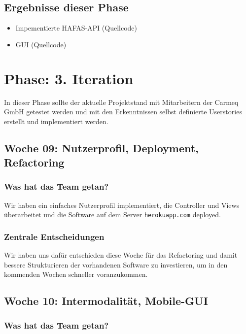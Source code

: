 \documentclass[12pt,a4paper]{article}
\begin{document}
\subsection{Ergebnisse dieser Phase}

\begin{itemize}
\item Impementierte HAFAS-API (Quellcode)
\item GUI (Quellcode)
\end{itemize}


\section{Phase: 3. Iteration}

In dieser Phase sollte der aktuelle Projektstand mit Mitarbeitern der Carmeq GmbH getestet werden und mit den Erkenntnissen selbst definierte Userstories erstellt und implementiert werden.

\subsection{Woche 09: Nutzerprofil, Deployment, Refactoring}

\subsubsection{Was hat das Team getan?}

Wir haben ein einfaches Nutzerprofil implementiert, die Controller und Views \"uberarbeitet und die Software auf dem Server \texttt{herokuapp.com} deployed.

\subsubsection{Zentrale Entscheidungen}

Wir haben uns dafür entschieden diese Woche für das Refactoring und damit bessere Strukturieren der vorhandenen Software zu investieren, um in den kommenden Wochen schneller voranzukommen.

\subsection{Woche 10: Intermodalit\"at, Mobile-GUI}

\subsubsection{Was hat das Team getan?}
\end{document}
